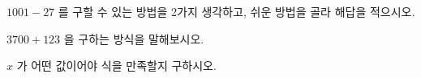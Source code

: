 \documentclass[a4paper,15pt]{exam}
\begin{document}
\begin{questions}


\newpage
\question $ 1001 - 27 $ 를 구할 수 있는 방법을 2가지 생각하고, 쉬운 방법을 골라 해답을 적으시오.

\question $ 3700 + 123 $ 을 구하는 방식을 말해보시오.


\question
$x$ 가 어떤 값이어야 식을 만족할지 구하시오.

\end{questions}
\end{document}
